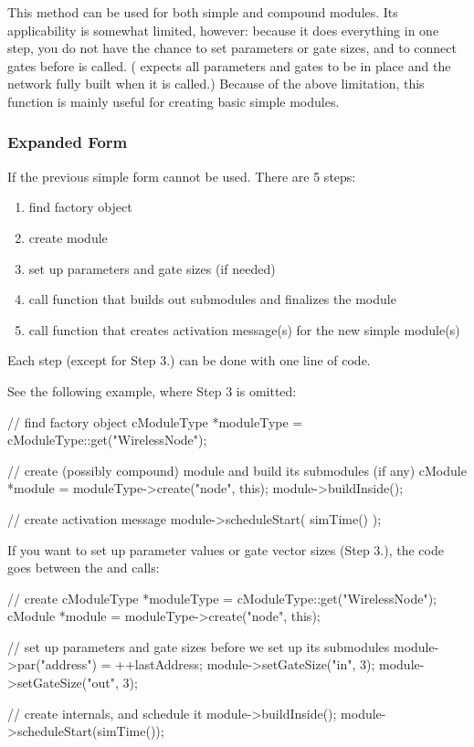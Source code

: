 This method can be used for both simple and compound modules.
Its applicability is somewhat limited, however:
because it does everything in one step, you do not have the chance to
set parameters or gate sizes, and to connect gates before
 is called.
( expects all parameters and gates to
be in place and the network fully built when it is called.)
Because of the above limitation, this function is mainly useful
for creating basic simple modules.

%
%

\subsubsection{Expanded Form}


If the previous simple form cannot be used. There are 5 steps:
\begin{enumerate}
  \item{find factory object}
  \item{create module}
  \item{set up parameters and gate sizes (if needed)}
  \item{call function that builds out submodules and finalizes the
    module}
  \item{call function that creates activation message(s) for the new
    simple module(s)}
\end{enumerate}
Each step (except for Step 3.) can be done with one line of code.



See the following example, where Step 3 is omitted:

\begin{cpp}
// find factory object
cModuleType *moduleType = cModuleType::get("WirelessNode");

// create (possibly compound) module and build its submodules (if any)
cModule *module = moduleType->create("node", this);
module->buildInside();

// create activation message
module->scheduleStart( simTime() );
\end{cpp}

If you want to set up parameter values or gate vector sizes (Step 3.),
the code goes between the  and
 calls:

\begin{cpp}
// create
cModuleType *moduleType = cModuleType::get("WirelessNode");
cModule *module = moduleType->create("node", this);

// set up parameters and gate sizes before we set up its submodules
module->par("address") = ++lastAddress;
module->setGateSize("in", 3);
module->setGateSize("out", 3);

// create internals, and schedule it
module->buildInside();
module->scheduleStart(simTime());
\end{cpp}


